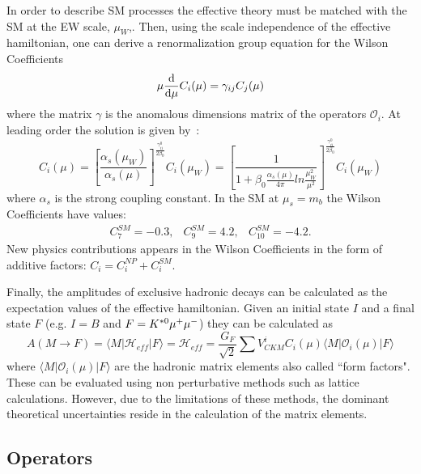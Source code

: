 In order to describe SM processes the effective theory must be matched
with the SM at the EW scale, $\mu_W$,. Then, using the scale independence of the
effective hamiltonian, one can derive a renormalization group equation for the Wilson Coefficients
%
\begin{equation}
\mu \frac{\mathrm{d}}{\mathrm{d} \mu} C_i(\mu) = \gamma_{ij}C_j(\mu)
\end{equation}
%
where the matrix $\gamma$ is the anomalous dimensions matrix of the operators $\mathcal{O}_i$.
At leading order the solution is given by~\cite{Buras:1998raa}:
%
\begin{equation}
C_i(\mu) = \left[ \frac{\alpha_s(\mu_W)}{\alpha_s(\mu)}\right]^{\frac{\gamma^0_{ii}}{2\beta_0}} C_i(\mu_W) = \left[ \frac{1}{1 + \beta_0\frac{\alpha_s(\mu)}{4\pi}ln\frac{\mu_W^2}{\mu^2}} \right]^{\frac{\gamma^0_{ii}}{2\beta_0}} C_i(\mu_W)
\end{equation}
%
where $\alpha_s$ is the strong coupling constant. In the SM at $\mu_s = m_b$ the
Wilson Coefficients have values:
%
\begin{equation}
\begin{array}{ccc}
C_7^{SM} = -0.3, & C_9^{SM} = 4.2, & C_{10}^{SM} = -4.2.
\end{array}
\end{equation}
%
New physics contributions appears in the Wilson Coefficients in the form of additive factors:
 $C_i = C_i^{NP} + C_i^{SM}$.

Finally, the amplitudes of exclusive hadronic decays can be calculated as the expectation 
values of the effective hamiltonian. Given an initial state $I$ and a final state $F$
(e.g. $I = B$ and $F=K^{*0}\mu^+\mu^-$) they can be calculated as
%
\begin{equation}
A(M\to F)= \langle M | \mathcal{H}_{eff} | F \rangle = 
\mathcal{H}_{eff} = \frac{G_F}{\sqrt{2}} \sum V_{CKM}^i C_i(\mu) \langle M | \mathcal{O}_i(\mu) | F \rangle
\end{equation}
where $\langle M | \mathcal{O}_i(\mu) | F \rangle$ are the hadronic matrix elements also called  ``form factors".
These can be evaluated using non perturbative methods such as lattice calculations.
However, due to the limitations of these methods, the dominant theoretical uncertainties
reside in the calculation of the matrix elements.

\subsection{Operators}

